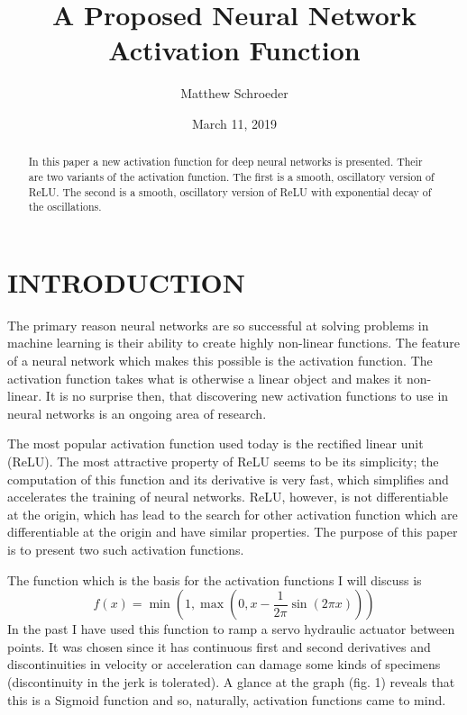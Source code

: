 \documentclass{amsart}
\theoremstyle{definition}
\theoremstyle{remark}
\numberwithin{equation}{section}
\begin{document}
\title{A Proposed Neural Network Activation Function}

\author{Matthew Schroeder}

\date{March 11, 2019}

\begin{abstract}
In this paper a new activation function for deep neural networks is presented.  Their are two variants of the activation function. The first is a smooth, oscillatory version of ReLU. The second is a smooth, oscillatory version of ReLU with exponential decay of the oscillations.
\end{abstract}

\maketitle

\section{INTRODUCTION}
The primary reason neural networks are so successful at solving problems in machine learning is their ability to create highly non-linear functions.   The feature of a neural network which makes this possible is the activation function.  The activation function takes what is otherwise a linear object and makes it non-linear.  It is no surprise then, that discovering new activation functions to use in neural networks is an ongoing area of research.   

The most popular activation function used today is the rectified linear unit (ReLU).  The most attractive property of ReLU seems to be its simplicity; the computation of this function and its derivative is very fast, which simplifies and accelerates the training of neural networks. ReLU, however, is not differentiable at the origin, which has lead to the search for other activation function which are differentiable at the origin and have similar properties.  The purpose of this paper is to present two such activation functions.    

The function which is the basis for the activation functions I will discuss is $$f(x) = \min(1, \max(0, x - \frac{1}{2\pi}\sin(2\pi x)))$$ In the past I have used this function to ramp a servo hydraulic actuator between points. It was chosen since it has continuous first and second derivatives and discontinuities in velocity or acceleration can damage some kinds of specimens (discontinuity in the jerk is tolerated).  A glance at the graph (fig. 1) reveals that this is a Sigmoid function and so, naturally, activation functions came to mind.   
\end{document}

